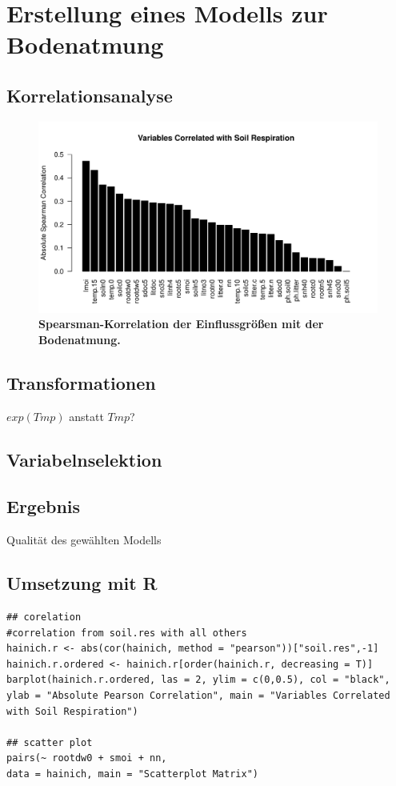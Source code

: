 \section{Erstellung eines Modells zur Bodenatmung}

\subsection{Korrelationsanalyse}

\begin{figure}
	\centering
	\includegraphics[width=\textwidth]{fig/spearsman-cor.pdf}
	\caption{\bf{Spearsman-Korrelation} der Einflussgrößen mit der Bodenatmung.}
\end{figure}

\subsection{Transformationen}
$exp(Tmp)$ anstatt $Tmp$?

\subsection{Variabelnselektion}

\subsection{Ergebnis}
Qualität des gewählten Modells

\subsection{Umsetzung mit R}

\begin{lstlisting}
## corelation
#correlation from soil.res with all others
hainich.r <- abs(cor(hainich, method = "pearson"))["soil.res",-1]
hainich.r.ordered <- hainich.r[order(hainich.r, decreasing = T)]
barplot(hainich.r.ordered, las = 2, ylim = c(0,0.5), col = "black", 
ylab = "Absolute Pearson Correlation", main = "Variables Correlated with Soil Respiration")

## scatter plot
pairs(~ rootdw0 + smoi + nn,
data = hainich, main = "Scatterplot Matrix")
\end{lstlisting}